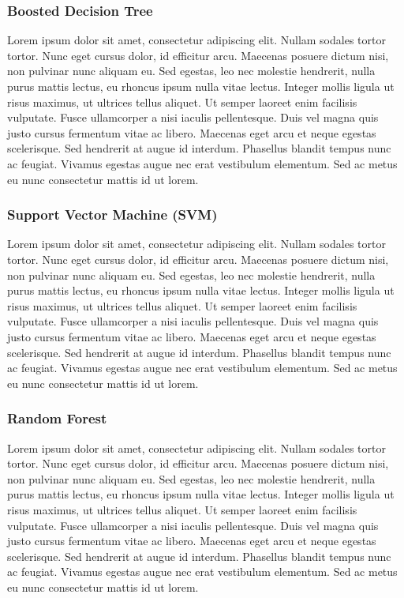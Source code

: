 \subsubsection{Boosted Decision Tree}
Lorem ipsum dolor sit amet, consectetur adipiscing elit. Nullam sodales tortor tortor. Nunc eget cursus dolor, id efficitur arcu. Maecenas posuere dictum nisi, non pulvinar nunc aliquam eu. Sed egestas, leo nec molestie hendrerit, nulla purus mattis lectus, eu rhoncus ipsum nulla vitae lectus. Integer mollis ligula ut risus maximus, ut ultrices tellus aliquet. Ut semper laoreet enim facilisis vulputate. Fusce ullamcorper a nisi iaculis pellentesque. Duis vel magna quis justo cursus fermentum vitae ac libero. Maecenas eget arcu et neque egestas scelerisque. Sed hendrerit at augue id interdum. Phasellus blandit tempus nunc ac feugiat. Vivamus egestas augue nec erat vestibulum elementum. Sed ac metus eu nunc consectetur mattis id ut lorem.

\subsubsection{Support Vector Machine (SVM)}
Lorem ipsum dolor sit amet, consectetur adipiscing elit. Nullam sodales tortor tortor. Nunc eget cursus dolor, id efficitur arcu. Maecenas posuere dictum nisi, non pulvinar nunc aliquam eu. Sed egestas, leo nec molestie hendrerit, nulla purus mattis lectus, eu rhoncus ipsum nulla vitae lectus. Integer mollis ligula ut risus maximus, ut ultrices tellus aliquet. Ut semper laoreet enim facilisis vulputate. Fusce ullamcorper a nisi iaculis pellentesque. Duis vel magna quis justo cursus fermentum vitae ac libero. Maecenas eget arcu et neque egestas scelerisque. Sed hendrerit at augue id interdum. Phasellus blandit tempus nunc ac feugiat. Vivamus egestas augue nec erat vestibulum elementum. Sed ac metus eu nunc consectetur mattis id ut lorem.

\subsubsection{Random Forest}
Lorem ipsum dolor sit amet, consectetur adipiscing elit. Nullam sodales tortor tortor. Nunc eget cursus dolor, id efficitur arcu. Maecenas posuere dictum nisi, non pulvinar nunc aliquam eu. Sed egestas, leo nec molestie hendrerit, nulla purus mattis lectus, eu rhoncus ipsum nulla vitae lectus. Integer mollis ligula ut risus maximus, ut ultrices tellus aliquet. Ut semper laoreet enim facilisis vulputate. Fusce ullamcorper a nisi iaculis pellentesque. Duis vel magna quis justo cursus fermentum vitae ac libero. Maecenas eget arcu et neque egestas scelerisque. Sed hendrerit at augue id interdum. Phasellus blandit tempus nunc ac feugiat. Vivamus egestas augue nec erat vestibulum elementum. Sed ac metus eu nunc consectetur mattis id ut lorem.

